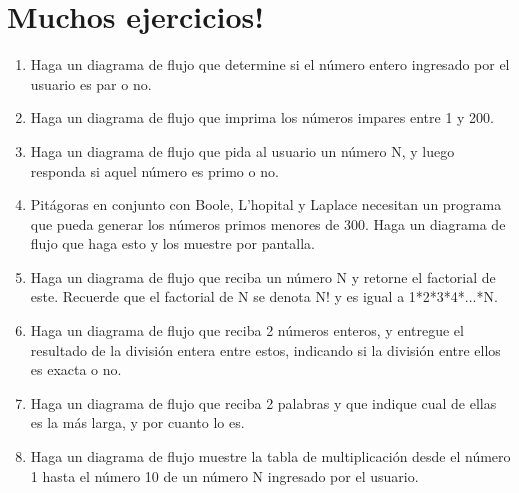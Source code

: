 \section{Muchos ejercicios!}

\begin{enumerate}
    \item Haga un diagrama de flujo que determine si el número entero ingresado por el usuario es par o no.
    \item Haga un diagrama de flujo que imprima los números impares entre 1 y 200.
    \item Haga un diagrama de flujo que pida al usuario un número N, y luego responda si aquel número es primo o no.
    \item Pitágoras en conjunto con Boole, L’hopital y Laplace necesitan un programa que pueda generar los números primos menores de 300. Haga un diagrama de flujo  que haga esto y los muestre por pantalla.
    \item Haga un diagrama de flujo  que reciba un número N y retorne el factorial de este. Recuerde que el factorial de N se denota N! y es igual a 1*2*3*4*...*N.
    \item Haga un diagrama de flujo que reciba 2 números enteros, y entregue el resultado de la división entera entre estos, indicando si la división entre ellos es exacta o no.
    \item Haga un diagrama de flujo que reciba 2 palabras y que indique cual de ellas es la más larga, y por cuanto lo es.
    \item Haga un diagrama de flujo muestre la tabla de multiplicación desde el número 1 hasta el número 10 de un número N ingresado por el usuario.
\end{enumerate}